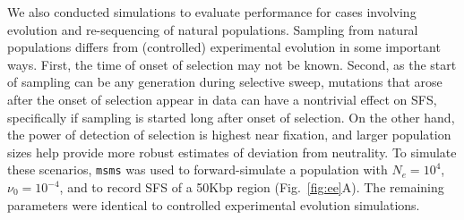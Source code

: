 We also conducted simulations to evaluate performance for cases
involving evolution and re-sequencing of natural populations. Sampling
from natural populations differs from (controlled) experimental
evolution in some important ways. First, the time of onset of
selection may not be known. Second, as the start of sampling can be
any generation during selective sweep, mutations that arose after the
onset of selection appear in data can have a nontrivial effect on SFS,
specifically if sampling is started long after onset of selection. On
the other hand, the power of detection of selection is highest near
fixation, and larger population sizes help provide more robust
estimates of deviation from neutrality. To simulate these scenarios,
\texttt{msms} was used to forward-simulate a population with
$N_e=10^4$, $\nu_0=10^{-4}$, and to record SFS of a 50Kbp region
(Fig.~\ref{fig:ee}A). The remaining parameters were identical to
controlled experimental evolution simulations.

